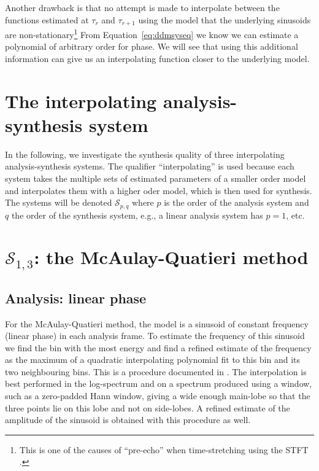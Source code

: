Another drawback is that no attempt is made to interpolate between the functions
estimated at $\tau_{r}$ and $\tau_{r+1}$ using the model that the underlying
sinusoids are non-stationary\footnote{%
    This is one of the causes of ``pre-echo'' when
    time-stretching using the STFT \cite{roebel2003transient}.%
}
From Equation~\ref{eq:ddmsyseq} we know we can estimate a polynomial of
arbitrary order for phase. We will see that using this additional information
can give us an interpolating function closer to the underlying model.

\section{The interpolating analysis-synthesis system}

In the following, we investigate the synthesis quality of three interpolating
analysis-synthesis systems. The qualifier ``interpolating'' is used because each
system takes the multiple sets of estimated parameters of a smaller order model
and interpolates them with a higher oder model, which is then used for
synthesis. The systems will be denoted $\mathscr{S}_{p,q}$ where $p$ is the
order of the analysis system and $q$ the order of the synthesis system, e.g., a
linear analysis system has $p=1$, etc.

\section{$\mathscr{S}_{1,3}$: the McAulay-Quatieri method}

\subsection{Analysis: linear phase \label{sec:S13analysis}}

For the McAulay-Quatieri method, the model is a sinusoid of constant frequency
(linear phase) in each analysis frame. To estimate the frequency of this
sinusoid we find the bin with the most energy and find a refined estimate of the
frequency as the maximum of a quadratic interpolating polynomial fit to this bin
and its two neighbouring bins. This is a procedure documented in
\cite[p.~45]{serra1989system}. The interpolation is best performed in the
log-spectrum and on a spectrum produced using a window, such as a zero-padded
Hann window, giving a wide enough main-lobe so that the three points lie on this
lobe and not on side-lobes. A refined estimate of the amplitude of the sinusoid
is obtained with this procedure as well.

